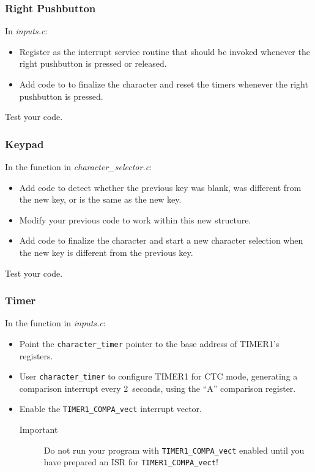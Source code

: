 \subsubsection{Right Pushbutton}

In \textit{inputs.c}:
\begin{itemize}
    \item Register  as the interrupt service routine that should be invoked whenever the right pushbutton is pressed or released.
    \item Add code to  to finalize the character and reset the timers whenever the right pushbutton is pressed.
\end{itemize}

Test your code.

\subsubsection{Keypad}

In the  function in \textit{character\_selector.c}:
\begin{itemize}
    \item Add code to detect whether the previous key was blank, was different from the new key, or is the same as the new key.
    \item Modify your previous code to work within this new structure.
    \item Add code to finalize the character and start a new character selection when the new key is different from the previous key.
\end{itemize}

Test your code.

\subsubsection{Timer}

In the  function in \textit{inputs.c}:
\begin{itemize}
    \item Point the \lstinline{character_timer} pointer to the base address of TIMER1's registers.
    \item User \lstinline{character_timer} to configure TIMER1 for CTC mode, generating a comparison interrupt every 2~seconds, using the ``A'' comparison register.
    \item Enable the \lstinline{TIMER1_COMPA_vect} interrupt vector.
        \begin{description}
            \item[Important] Do not run your program with \lstinline{TIMER1_COMPA_vect} enabled until you have prepared an ISR for \lstinline{TIMER1_COMPA_vect}!
        \end{description}
\end{itemize}

